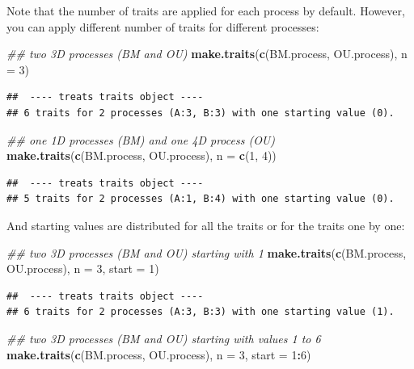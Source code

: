 \documentclass[
]{book}
\newenvironment{Shaded}{\begin{snugshade}}{\end{snugshade}}
\newcommand{\CommentTok}[1]{\textcolor[rgb]{0.56,0.35,0.01}{\textit{#1}}}
\newcommand{\DataTypeTok}[1]{\textcolor[rgb]{0.13,0.29,0.53}{#1}}
\newcommand{\DecValTok}[1]{\textcolor[rgb]{0.00,0.00,0.81}{#1}}
\newcommand{\KeywordTok}[1]{\textcolor[rgb]{0.13,0.29,0.53}{\textbf{#1}}}
\newcommand{\NormalTok}[1]{#1}
\newcommand{\OperatorTok}[1]{\textcolor[rgb]{0.81,0.36,0.00}{\textbf{#1}}}
\begin{document}
Note that the number of traits are applied for each process by default.
However, you can apply different number of traits for different processes:

\begin{Shaded}
\begin{Highlighting}[]
\CommentTok{\#\# two 3D processes (BM and OU)}
\KeywordTok{make.traits}\NormalTok{(}\KeywordTok{c}\NormalTok{(BM.process, OU.process), }\DataTypeTok{n =} \DecValTok{3}\NormalTok{)}
\end{Highlighting}
\end{Shaded}

\begin{verbatim}
##  ---- treats traits object ---- 
## 6 traits for 2 processes (A:3, B:3) with one starting value (0).
\end{verbatim}

\begin{Shaded}
\begin{Highlighting}[]
\CommentTok{\#\# one 1D processes (BM) and one 4D process (OU)}
\KeywordTok{make.traits}\NormalTok{(}\KeywordTok{c}\NormalTok{(BM.process, OU.process), }\DataTypeTok{n =} \KeywordTok{c}\NormalTok{(}\DecValTok{1}\NormalTok{, }\DecValTok{4}\NormalTok{))}
\end{Highlighting}
\end{Shaded}

\begin{verbatim}
##  ---- treats traits object ---- 
## 5 traits for 2 processes (A:1, B:4) with one starting value (0).
\end{verbatim}

And starting values are distributed for all the traits or for the traits one by one:

\begin{Shaded}
\begin{Highlighting}[]
\CommentTok{\#\# two 3D processes (BM and OU) starting with 1}
\KeywordTok{make.traits}\NormalTok{(}\KeywordTok{c}\NormalTok{(BM.process, OU.process), }\DataTypeTok{n =} \DecValTok{3}\NormalTok{, }\DataTypeTok{start =} \DecValTok{1}\NormalTok{)}
\end{Highlighting}
\end{Shaded}

\begin{verbatim}
##  ---- treats traits object ---- 
## 6 traits for 2 processes (A:3, B:3) with one starting value (1).
\end{verbatim}

\begin{Shaded}
\begin{Highlighting}[]
\CommentTok{\#\# two 3D processes (BM and OU) starting with values 1 to 6}
\KeywordTok{make.traits}\NormalTok{(}\KeywordTok{c}\NormalTok{(BM.process, OU.process), }\DataTypeTok{n =} \DecValTok{3}\NormalTok{, }\DataTypeTok{start =} \DecValTok{1}\OperatorTok{:}\DecValTok{6}\NormalTok{)}
\end{Highlighting}
\end{Shaded}
\end{document}
